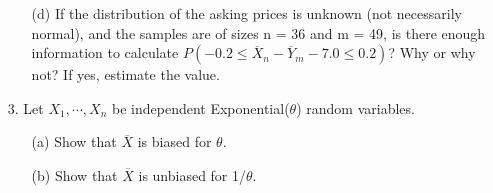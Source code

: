 \begin{itemize}
\begin{itemize}
\begin{mdframed}
            \end{mdframed}
            
            \item [(d)]
            If the distribution of the asking prices is unknown (not necessarily normal), and the samples are of sizes n = 36 and m = 49, is there enough information to calculate $P(-0.2 \leq \overline{X}_{n} - \overline{Y}_{m} - 7.0 \leq 0.2)$? Why or why not? If yes, estimate the value.
            \\
            \begin{mdframed}
                
            \end{mdframed}
        \end{itemize}

        \item[3.]
        Let $X_{1}, \cdots, X_{n}$ be independent Exponential($\theta$) random variables.

        \begin{itemize}
            \item [(a)]
            Show that $\overline{X}$ is biased for $\theta$. 
            \begin{mdframed}
                
            \end{mdframed}

            \item [(b)]
            Show that $\overline{X}$ is unbiased for 1/$\theta$.
            \begin{mdframed}
                
            \end{mdframed}
        \end{itemize}
    \end{itemize}

